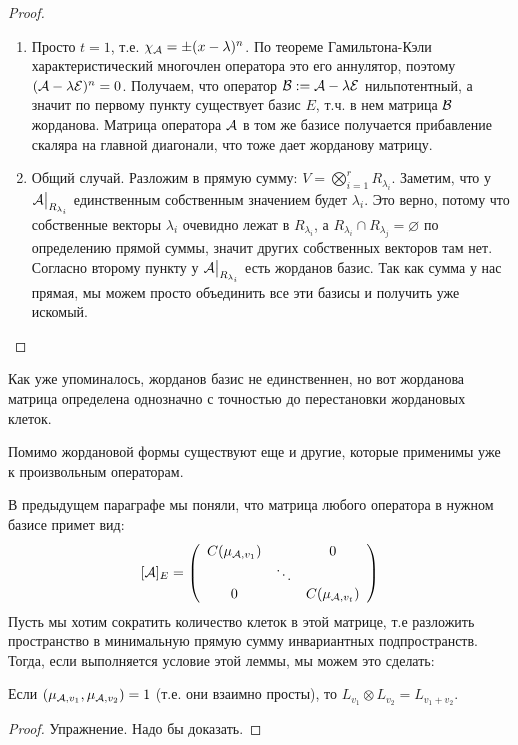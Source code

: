 \begin{proof}
\begin{enumerate}
        \item Просто $t = 1$, т.е. $\chi_{\mathcal{A}} = \pm (x - \lambda)^n$. 
        По теореме Гамильтона-Кэли характеристический многочлен оператора это его аннулятор, поэтому $(\mathcal{A} - \lambda \mathcal{E})^n = 0$. 
        Получаем, что оператор $\mathcal{B} := \mathcal{A} - \lambda \mathcal{E}$ нильпотентный, а значит по первому пункту существует базис $E$, т.ч. в нем матрица $\mathcal{B}$ жорданова. 
        Матрица оператора $\mathcal{A}$ в том же базисе получается прибавление скаляра на главной диагонали, что тоже дает жорданову матрицу.
        
        \item Общий случай. Разложим в прямую сумму: $V = \bigotimes\limits_{i = 1}^{r} R_{\lambda_i}$.
        Заметим, что у $\mathcal{A} \big|_{R_{\lambda_i}}$ единственным собственным значением будет $\lambda_i$.
        Это верно, потому что собственные векторы $\lambda_i$ очевидно лежат в $R_{\lambda_i}$, а $R_{\lambda_i} \cap R_{\lambda_j} = \varnothing$ по определению прямой суммы, значит других собственных векторов там нет.
        Согласно второму пункту у $\mathcal{A} \big|_{R_{\lambda_i}}$ есть жорданов базис.
        Так как сумма у нас прямая, мы можем просто объединить все эти базисы и получить уже искомый.
    \end{enumerate}
\end{proof}

\notice Как уже упоминалось, жорданов базис не единственнен, но вот жорданова матрица определена однозначно с точностью до перестановки жордановых клеток. 

\vspace*{5mm}

Помимо жордановой формы существуют еще и другие, которые применимы уже к произвольным операторам.

В предыдущем параграфе мы поняли, что матрица любого оператора в нужном базисе примет вид:
\[
  [ \mathcal{A} ]_{E} = \left(\begin{array}{ccc}
  C(\mu_{\mathcal{A}, v_1}) &  & 0 \\ 
   & \ddots &  \\ 
  0 &  & C(\mu_{\mathcal{A}, v_t})
  \end{array}\right)  
\]
Пусть мы хотим сократить количество клеток в этой матрице, т.е разложить пространство в минимальную прямую сумму инвариантных подпространств.
Тогда, если выполняется условие этой леммы, мы можем это сделать:
\begin{lemma}
    Если $(\mu_{\mathcal{A}, v_1}, \mu_{\mathcal{A}, v_2}) = 1$ (т.е. они взаимно просты), то $L_{v_1} \otimes L_{v_2} = L_{v_1 + v_2}$.
\end{lemma}
\begin{proof}
    Упражнение. Надо бы доказать.
\end{proof}

